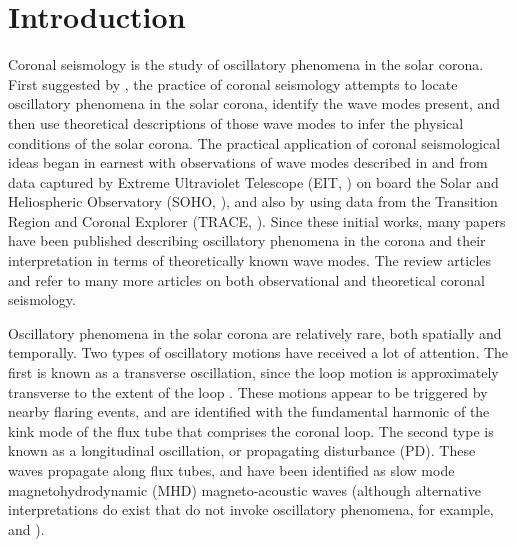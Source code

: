\documentclass[onecolumn]{emulateapj}
\newcommand{\BF}{ }
\begin{document}

\section{Introduction}\label{sec:int}
Coronal seismology is the study of oscillatory phenomena in the solar
corona.  First suggested by \cite{1970PASJ...22..341U}, the practice
of coronal seismology attempts to locate oscillatory phenomena in the
solar corona, identify the wave modes present, and then use
theoretical descriptions of those wave modes to infer the physical
conditions of the solar corona.  The practical application of coronal
seismological ideas began in earnest with observations of wave modes
{\BF described in \cite{1998ApJ...501L.217D} and
  \cite{1999SoPh..186..207B} from data captured by Extreme Ultraviolet
  Telescope (EIT, \citealp{1995SoPh..162..291D}) on board the Solar and Heliospheric
  Observatory (SOHO, \citealp{1995SoPh..162....1D}), and also by
  \citep{1999ApJ...520..880A} using data from the Transition Region
  and Coronal Explorer (TRACE, \citealp{1999SoPh..187..229H}).  Since these initial works,
  many papers have been published describing oscillatory phenomena in
  the corona and their interpretation in terms of theoretically known
  wave modes.  The review articles \cite{lrsp-2005-3} and
  \cite{2012RSPTA.370.3193D} refer to many more articles on both
  observational and theoretical coronal seismology}.

Oscillatory phenomena in the solar corona are relatively rare, both
spatially and temporally.  Two types of oscillatory motions have
received a lot of attention.  The first is known as a transverse
oscillation, since the loop motion is approximately transverse to the
extent of the loop \citep{1999Sci...285..862N}.  These motions appear
to be triggered by nearby flaring events, and are identified with the
fundamental harmonic of the kink mode of the flux tube that comprises
the coronal loop.  The second type is known as a longitudinal
oscillation, or propagating disturbance (PD).  These waves propagate
along flux tubes, and have been identified as slow mode
magnetohydrodynamic (MHD) magneto-acoustic waves (although alternative
interpretations do exist that do not invoke oscillatory phenomena, for
example, \citealp*{0004-637X-722-2-1013} and
\citealp*{2041-8205-727-2-L37}).  
\end{document}
